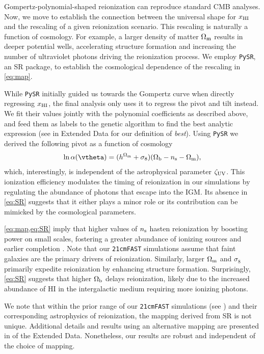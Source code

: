 Gompertz-polynomial-shaped reionization can reproduce standard CMB analyses.
Now, we move to establish the connection
between the universal shape for $x_{\mathrm{HI}}$ and the rescaling of a given
reionization scenario.
This rescaling is naturally a function of cosmology.
For example, a larger density of matter $\Omega_\mathrm{m}$ results in deeper
potential wells, accelerating structure formation and increasing the
number of ultraviolet photons driving the reionization process.
We employ \texttt{PySR}, an SR package, to establish the cosmological dependence 
of the rescaling in \cref{eq:map}.

While \texttt{PySR} initially guided us towards the Gompertz curve when
directly regressing $x_{\mathrm{HI}}$, the final analysis only uses it to regress
the pivot and tilt instead.
We fit their values jointly with the polynomial coefficients as
described above, and feed them as labels to the genetic algorithm to
find the best analytic expression (see  in Extended
Data for our definition of \emph{best}).
Using \texttt{PySR} we derived the following pivot as a function of
cosmology
%
\begin{equation}
\label{eq:SR}
\ln\ap(\vtheta) = (h^{\Omegam} + \sigma_8) (\Omegab - \ns - \Omegam),
\end{equation}
which, interestingly, is independent of the astrophysical parameter $\zeta_\mathrm{UV}$.
This ionization efficiency modulates the timing of reionization in our simulations
by regulating the abundance of photons that escape into the IGM. Its absence in
\cref{eq:SR} suggests that it either plays a minor role or its contribution can be
 mimicked by the cosmological parameters.

\cref{eq:map,eq:SR} imply that higher values of $n_\mathrm{s}$ hasten
reionization by boosting power on small scales, fostering a greater
abundance of ionizing sources and earlier completion \cite{Montero2021}.
Note that our \texttt{21cmFAST} simulations assume that faint galaxies
are the primary drivers of reionization.
Similarly, larger $\Omega_\mathrm{m}$ and $\sigma_8$ primarily expedite
reionization by enhancing structure formation.
Surprisingly, \cref{eq:SR} suggests that higher $\Omega_\mathrm{b}$ delays
reionization, likely due to the increased abundance of HI in the
intergalactic medium requiring more ionizing photons.

We note that within the prior range of our \texttt{21cmFAST} simulations
(see ) and their corresponding astrophysics of
reionization, the mapping derived from SR is not unique.
Additional details and results using an alternative mapping are
presented in  of the Extended Data.
Nonetheless, our results are robust and independent of the choice of
mapping.

